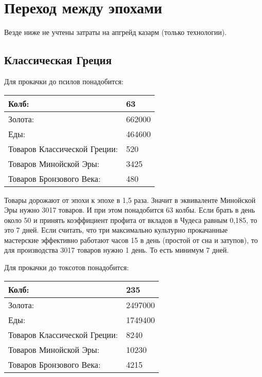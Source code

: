 \section{Переход между эпохами}
\label{section:epochs} 

Везде ниже не учтены затраты на апгрейд казарм (только технологии).



\subsection{Классическая Греция}

Для прокачки до псилов понадобится:

\begin{center}
    \begin{tabular}[h!]{|l|l|}
        \hline
        Колб:   & 63 \\\hline
        Золота: & 662000 \\\hline
        Еды:    & 464600 \\\hline
        Товаров Классической Греции: & 520 \\\hline
        Товаров Минойской Эры: & 3425 \\\hline
        Товаров Бронзового Века: & 480 \\\hline
    \end{tabular}
\end{center}

Товары дорожают от эпохи к эпохе в 1,5 раза.
Значит в эквиваленте Минойской Эры нужно 3017 товаров.
И при этом понадобится 63 колбы. Если брать в день около 50 и принять коэффициент профита от вкладов
в Чудеса равным 0,185, то это 7 дней.
Если считать, что три максимально культурно прокачанные мастерские эффективно работают часов 15 в день (простой от сна и затупов),
то для производства 3017 товаров нужно 1 день.
То есть минимум 7 дней.


Для прокачки до токсотов понадобится:

\begin{center}
    \begin{tabular}[h!]{|l|l|}
        \hline
        Колб:   & 235 \\\hline
        Золота: & 2497000 \\\hline
        Еды:    & 1749400 \\\hline
        Товаров Классической Греции: & 8240 \\\hline
        Товаров Минойской Эры: & 10230 \\\hline
        Товаров Бронзового Века: & 4215 \\\hline
    \end{tabular}
\end{center}

